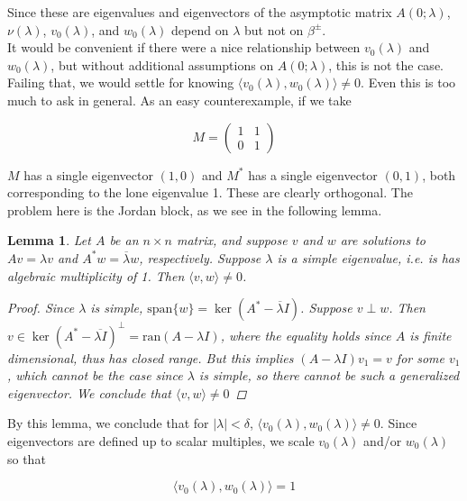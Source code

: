 \documentclass[12pt]{article}
\newtheorem{lemma}{Lemma}
\begin{document}
Since these are eigenvalues and eigenvectors of the asymptotic matrix $A(0; \lambda)$, $\nu(\lambda)$, $v_0(\lambda)$, and $w_0(\lambda)$ depend on $\lambda$ but not on $\beta^\pm$.\\

It would be convenient if there were a nice relationship between $v_0(\lambda)$ and $w_0(\lambda)$, but without additional assumptions on $A(0; \lambda)$, this is not the case. Failing that, we would settle for knowing $\langle v_0(\lambda), w_0(\lambda) \rangle \neq 0$. Even this is too much to ask in general. As an easy counterexample, if we take

\[
M = \begin{pmatrix}1 & 1 \\ 0 & 1 \end{pmatrix}
\]

$M$ has a single eigenvector $(1, 0)$ and $M^*$ has a single eigenvector $(0, 1)$, both corresponding to the lone eigenvalue 1. These are clearly orthogonal. The problem here is the Jordan block, as we see in the following lemma.


\begin{lemma}\label{perpeigs}
Let $A$ be an $n \times n$ matrix, and suppose $v$ and $w$ are solutions to $Av = \lambda v$ and $A^*w = \overline{\lambda}w$, respectively. Suppose $\lambda$ is a simple eigenvalue, i.e. is has algebraic multiplicity of 1. Then $\langle v, w \rangle \neq 0$.
\begin{proof}
Since $\lambda$ is simple, $\text{span} \{w\} = \ker(A^* - \overline{\lambda}I)$. Suppose $v \perp w$. Then $v \in \ker(A^* - \overline{\lambda I})^\perp = \text{ran}(A - \lambda I)$, where the equality holds since $A$ is finite dimensional, thus has closed range. But this implies $(A - \lambda I)v_1 = v$ for some $v_1$, which cannot be the case since $\lambda$ is simple, so there cannot be such a generalized eigenvector. We conclude that $\langle v, w \rangle \neq 0$
\end{proof}
\end{lemma}

By this lemma, we conclude that for $|\lambda| < \delta$, $\langle v_0(\lambda), w_0(\lambda) \rangle \neq 0$. Since eigenvectors are defined up to scalar multiples, we scale $v_0(\lambda)$ and/or $w_0(\lambda)$ so that

\begin{equation}\label{v0w0IP1}
\langle v_0(\lambda), w_0(\lambda) \rangle = 1
\end{equation}
 
\end{document}
